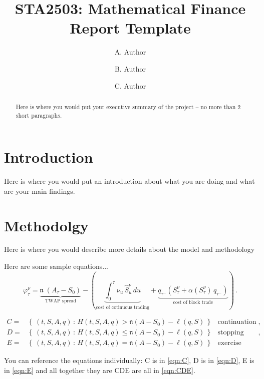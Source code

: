 \documentclass[12pt]{amsart}
\title[]{STA2503:  Mathematical Finance Report Template}
\author{A. Author}
\author{B. Author}
\author{C. Author}
\begin{document}
\begin{abstract}
Here is where you would put your executive summary of the project -- no more than 2 short paragraphs.
\end{abstract}


\maketitle

\section{Introduction}

Here is where you would put an introduction about what you are doing and what are your main findings.

\section{Methodolgy}

Here is where you would describe more details about the model and methodology

Here are some sample equations...
\begin{equation}
\varphi_\tau^\nu = \underbrace{\mathfrak n \;(A_\tau-S_0)}_\text{TWAP spread} -
\left(\underbrace{ \int_{0}^\tau\nu_u \,\hat{S}_u^\nu \,du}_\text{cost of cotinuous trading} +  \underbrace{q_{\tau^-} \left(S_\tau^\nu+\alpha(S_\tau^\nu)\, q_{\tau^-} \right) }_\text{cost of block trade}\right)\,. \label{eqn:payoff}
\end{equation}

\begin{subequations}
\begin{align}
C=&\left\{\,(t,S,A,q)\, : \, H(t,S,A,q)>\mathfrak n (A-S_0)- \ell(q,S) \,\right\} & \text{continuation region},
\label{eqn:C} \\
D=&\left\{\,(t,S,A,q)\, : \, H(t,S,A,q) \leq \mathfrak n (A-S_0)- \ell(q,S)\,\right\} & \text{stopping region},
\label{eqn:D} \\
E=&\left\{\,(t,S,A,q)\, : \, H(t,S,A,q) = \mathfrak n (A-S_0)- \ell(q,S)\,\right\} & \text{exercise boundary.}
\label{eqn:E}
\end{align}
\label{eqn:CDE}
\end{subequations}

You can reference the equations individually: C is in \eqref{eqn:C}, D is in \eqref{eqn:D}, E is in \eqref{eqn:E} and all together they are CDE are all in \eqref{eqn:CDE}.
\end{document}
